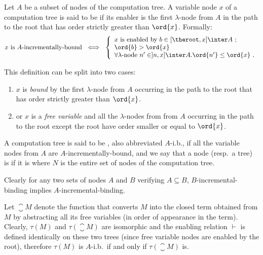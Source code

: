 \begin{definition}
Let $A$ be a subset of nodes of the computation tree. A variable
node $x$ of a computation tree is said to be
 if its enabler is the first
$\lambda$-node from $A$ in the path to the root that has order
strictly greater than $\ord{x}$. Formally:
\begin{align*}
x \mbox{ is $A$-incrementally-bound} \  \iff \  \left\{
                                                  \begin{array}{ll}
                                                    x \hbox{ is enabled by } b \in [\theroot,x]\inter A \ ; \\
                                                    \ord{b} > \ord{x} \;\\
                                                    \forall \lambda\mbox{-node } n' \in ]n,x]\inter A  . \ord{n'} \leq \ord{x} \ .
                                                  \end{array}
                                                \right.
\end{align*}

This definition can be split into two cases:
\begin{enumerate}
\item $x$ is \emph{bound} by the first $\lambda$-node from $A$ occurring in the path to the root that has
order strictly greater than $\ord{x}$.
\item or $x$ is a \emph{free variable} and all the $\lambda$-nodes from from $A$ occurring in the path to the root except the root have order
 smaller or equal to $\ord{x}$.
\end{enumerate}

A computation tree is said to be ,
also abbreviated $A$-i.b., if all the variable nodes from $A$ are
$A$-incrementally-bound, and we say that a node (resp.\ a tree) is
 if it is
 where $N$ is the entire set of nodes of the computation tree.
\end{definition}

Clearly for any two sets of nodes $A$ and $B$ verifying $A\subseteq
B$, $B$-incremental-binding implies
$A$-incremental-binding.


\smallskip

Let $\closure{M}$ denote the function that converts $M$ into the
closed term obtained from $M$ by abstracting all its free variables
(in order of appearance in the term).
Clearly, $\tau(M)$ and $\tau(\closure{M})$ are isomorphic and the enabling relation $\vdash$ is defined identically
on these two trees (since free variable nodes are enabled by the root), therefore $\tau(M)$ is $A$-i.b.\ if and only if $\tau(\closure{M})$ is.
\smallskip

